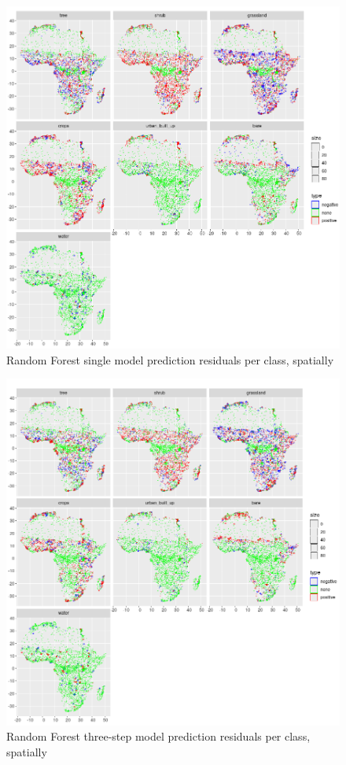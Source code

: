 \documentclass[a4paper,10pt]{article}
\begin{document}
\begin{figure}
    \includegraphics[width=\textwidth]{article-figures/maps/2019-03-26-rf-1m-bubble}
    \caption{Random Forest single model prediction residuals per class, spatially}
    \label{resid-rf-1m-uncor}
\end{figure}
\begin{figure}
    \includegraphics[width=\textwidth]{article-figures/maps/2019-03-26-rf-3m-bubble}
    \caption{Random Forest three-step model prediction residuals per class, spatially}
    \label{resid-rf-3m-uncor}
\end{figure}
\end{document}
